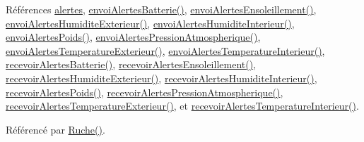 Références \hyperlink{class_ruche_af07644ddce44cb5ed4286475dc0f9d46}{alertes}, \hyperlink{class_ruche_ac76ce5692e134b365330d91af2a6b4e7}{envoi\+Alertes\+Batterie()}, \hyperlink{class_ruche_aa3d500a4a0e5ed60da000af15000505e}{envoi\+Alertes\+Ensoleillement()}, \hyperlink{class_ruche_abef2fd2fdeaee8bc19fa1ce13b32f4d0}{envoi\+Alertes\+Humidite\+Exterieur()}, \hyperlink{class_ruche_a0f1dfe6d0a677341e29296e044d91975}{envoi\+Alertes\+Humidite\+Interieur()}, \hyperlink{class_ruche_a21d7f05b696896b1a3c7e20c396aaf23}{envoi\+Alertes\+Poids()}, \hyperlink{class_ruche_a97ae09a121944f7df48fb38bd049b878}{envoi\+Alertes\+Pression\+Atmospherique()}, \hyperlink{class_ruche_a5bb36a4bb9692a744a1b7ebc5fc59f57}{envoi\+Alertes\+Temperature\+Exterieur()}, \hyperlink{class_ruche_ac2f37831cb8c70ac4df2a3ac805b728b}{envoi\+Alertes\+Temperature\+Interieur()}, \hyperlink{class_ruche_aee278a316c2e462e43705e15a36ab43f}{recevoir\+Alertes\+Batterie()}, \hyperlink{class_ruche_afdfb0cff676b6de5f421aed01c3d49db}{recevoir\+Alertes\+Ensoleillement()}, \hyperlink{class_ruche_a6b12ebe7e83f12b31e49b44e25fdfa58}{recevoir\+Alertes\+Humidite\+Exterieur()}, \hyperlink{class_ruche_af7b500ef1469f689dfe6b78ae6e3c025}{recevoir\+Alertes\+Humidite\+Interieur()}, \hyperlink{class_ruche_aa5dc6e5c65d0a685dcaa1c698b25e938}{recevoir\+Alertes\+Poids()}, \hyperlink{class_ruche_aa649f21e5d2a196bc7fbc570dc731ade}{recevoir\+Alertes\+Pression\+Atmospherique()}, \hyperlink{class_ruche_af09b04e9a415ad3df9941068b74046fc}{recevoir\+Alertes\+Temperature\+Exterieur()}, et \hyperlink{class_ruche_a2984c1e492d1ceacd3081e39a4f8cc26}{recevoir\+Alertes\+Temperature\+Interieur()}.



Référencé par \hyperlink{class_ruche_a8b4ee3752d984c5acee93b990db7939a}{Ruche()}.


